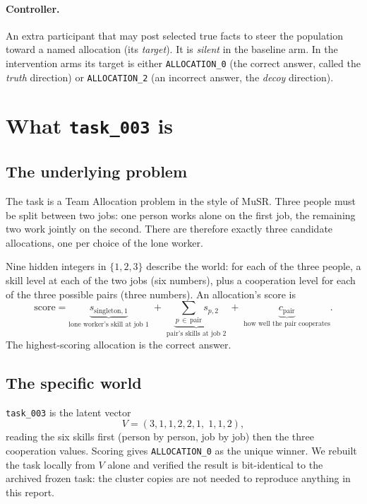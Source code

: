 \documentclass[11pt,a4paper]{article}
\newcommand{\A}[1]{\texttt{ALLOCATION\_#1}}
\begin{document}
\paragraph{Controller.} An extra participant that may post selected true facts to
steer the population toward a named allocation (its \emph{target}). It is
\emph{silent} in the baseline arm. In the intervention arms its target is either
\A{0} (the correct answer, called the \emph{truth} direction) or \A{2} (an
incorrect answer, the \emph{decoy} direction).

\section{What \texttt{task\_003} is}

\subsection{The underlying problem}

The task is a Team Allocation problem in the style of MuSR. Three people must be
split between two jobs: one person works alone on the first job, the remaining
two work jointly on the second. There are therefore exactly three candidate
allocations, one per choice of the lone worker.

Nine hidden integers in $\{1,2,3\}$ describe the world: for each of the three
people, a skill level at each of the two jobs (six numbers), plus a cooperation
level for each of the three possible pairs (three numbers). An allocation's score
is
\begin{equation}
  \text{score} = \underbrace{s_{\text{singleton},1}}_{\text{lone worker's skill at job 1}}
  \;+\; \underbrace{\sum_{p \,\in\, \text{pair}} s_{p,2}}_{\text{pair's skills at job 2}}
  \;+\; \underbrace{c_{\text{pair}}}_{\text{how well the pair cooperates}} .
\end{equation}
The highest-scoring allocation is the correct answer.

\subsection{The specific world}

\texttt{task\_003} is the latent vector
\begin{equation}
  V = (3,1,1,2,2,1,\;1,1,2),
\end{equation}
reading the six skills first (person by person, job by job) then the three
cooperation values. Scoring gives \A{0} as the unique winner. We rebuilt the task
locally from $V$ alone and verified the result is bit-identical to the archived
frozen task: the cluster copies are not needed to reproduce anything in this
report.
\end{document}
